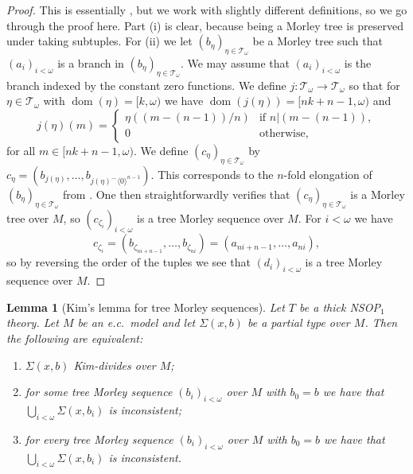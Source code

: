 \documentclass[a4paper, reqno]{amsart}
\newtheorem{lemma}[theorem]{Lemma}
\theoremstyle{definition}
\theoremstyle{repeat}
\newcommand{\T}{\mathcal{T}}
\DeclareMathOperator{\dom}{dom}
\begin{document}
\begin{proof}
This is essentially \cite[Lemma 5.9]{kaplan_kim-independence_2020}, but we work with slightly different definitions, so we go through the proof here. Part (i) is clear, because being a Morley tree is preserved under taking subtuples. For (ii) we let $(b_\eta)_{\eta \in \T_\omega}$ be a Morley tree such that $(a_i)_{i < \omega}$ is a branch in $(b_\eta)_{\eta \in \T_\omega}$. We may assume that $(a_i)_{i < \omega}$ is the branch indexed by the constant zero functions. We define $j: \T_\omega \to \T_\omega$ so that for $\eta \in \T_\omega$ with $\dom(\eta) = [k, \omega)$ we have $\dom(j(\eta)) = [nk+n-1, \omega)$ and
\[
j(\eta)(m) = \begin{cases}
\eta((m-(n-1))/n) & \text{if } n | (m-(n-1)), \\
0 & \text{otherwise},
\end{cases}
\]
for all $m \in [nk + n - 1, \omega)$. We define $(c_\eta)_{\eta \in \T_\omega}$ by $c_\eta = (b_{j(\eta)}, \ldots, b_{j(\eta)^\frown \langle 0 \rangle^{n-1}})$. This corresponds to the $n$-fold elongation of $(b_\eta)_{\eta \in \T_\omega}$ from \cite{chernikov_model-theoretic_2016}. One then straightforwardly verifies that $(c_\eta)_{\eta \in \T_\omega}$ is a Morley tree over $M$, so $(c_{\zeta_i})_{i < \omega}$ is a tree Morley sequence over $M$. For $i < \omega$ we have
\[
c_{\zeta_i} = (b_{\zeta_{ni+n-1}}, \ldots, b_{\zeta_{ni}}) = (a_{ni+n-1}, \ldots, a_{ni}),
\]
so by reversing the order of the tuples we see that $(d_i)_{i < \omega}$ is a tree Morley sequence over $M$.
\end{proof}
\begin{lemma}[Kim's lemma for tree Morley sequences]
Let $T$ be a thick NSOP$_1$ theory. Let $M$ be an e.c.\ model and let $\Sigma(x, b)$ be a partial type over $M$. Then the following are equivalent:
\begin{enumerate}[label=(\roman*)]
\item $\Sigma(x, b)$ Kim-divides over $M$;
\item for some tree Morley sequence $(b_i)_{i < \omega}$ over $M$ with $b_0 = b$ we have that $\bigcup_{i < \omega} \Sigma(x, b_i)$ is inconsistent;
\item for every tree Morley sequence $(b_i)_{i < \omega}$ over $M$ with $b_0 = b$ we have that $\bigcup_{i < \omega} \Sigma(x, b_i)$ is inconsistent.
\end{enumerate} 
\end{lemma}
\end{document}
